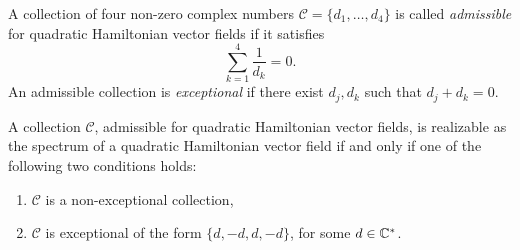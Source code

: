 \documentclass[phd,tocprelim]{cornell}
\begin{document}
\begin{definition}
A collection of four non-zero complex numbers $\mathcal{C}=\{d_1,\ldots,d_4\}$ is called \emph{admissible} for quadratic Hamiltonian vector fields if it satisfies
\[ \sum_{k=1}^4 \frac{1}{d_k} = 0. \]
An admissible collection is \emph{exceptional} if there exist $d_j,d_k$ such that $d_j+d_k=0$.
\end{definition}

\begin{theorem}\label{thm:realization}
A collection $\mathcal{C}$, admissible for quadratic Hamiltonian vector fields, is realizable as the spectrum of a quadratic Hamiltonian vector field if and only if one of the following two conditions holds:
\begin{enumerate}
 \item $\mathcal{C}$ is a non-exceptional collection,
 \item $\mathcal{C}$ is exceptional of the form $\{d,-d,d,-d\}$, for some $d\in\mathbb{C}^{\ast}$.
\end{enumerate}
\end{theorem}
\end{document}

